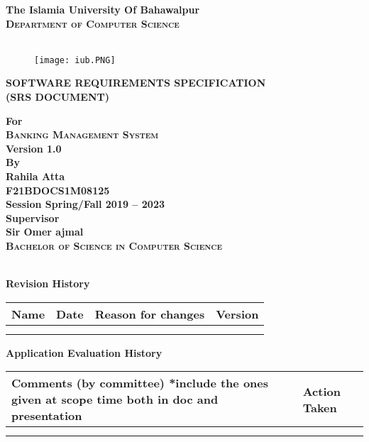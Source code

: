 \documentclass{article}
\begin{document}
\begin{titlepage}
    \centering
    {\bfseries\Large\gothfamily The Islamia University Of Bahawalpur}\\ \hfill \break
    {\Large\bfseries\scshape Department of Computer Science}\\\\
    \begin{figure}[htp]
    \centering
    \texttt{[image: iub.PNG]}
    \label{fig:iub}
\end{figure}
    {\bfseries\Large SOFTWARE REQUIREMENTS SPECIFICATION}\\\hfill \break
    \textbf{(SRS DOCUMENT)}\\\hfill \break
    
    {\bfseries\Large For}\\ \hfill \break
    {\Large\bfseries\scshape Banking Management System}\\ \hfill \break
    \textbf{Version 1.0}\\ \hfill \break
    {\bfseries\Large By}\\ \hfill \break
    {\bfseries\Large Rahila Atta}\\ \hfill \break
    {\bfseries\Large F21BDOCS1M08125}\\ \hfill \break
    {\bfseries Session Spring/Fall 2019 – 2023}\\ \hfill \break
    {\bfseries\Large Supervisor}\\ \hfill \break
    {\bfseries\Large Sir Omer ajmal}\\ \hfill \break
    {\Large\bfseries\scshape Bachelor of Science in Computer Science }\\
  
  \end{titlepage}
\newpage
\tableofcontents
\newpage
\\
\textbf{Revision History}\\ \hfill \break
\begin{tabularx}{0.8\textwidth} { 
  | >{\raggedright\arraybackslash}X 
  | >{\centering\arraybackslash}X 
  | >{\raggedleft\arraybackslash}X 
  | >{\raggedleft\arraybackslash}X |}
 \hline
 Name & Date & Reason for changes & Version \\
 \hline
   &   &   &   &  \\
\hline
  &   &   &   &  \\
\hline
\end{tabularx}
\newpage
\textbf{Application Evaluation History}\\ \hfill \break
\begin{tabularx}{0.8\textwidth} { 
  | >{\raggedright\arraybackslash}X  
  | >{\raggedleft\arraybackslash}X |}
 \hline
 Comments (by committee)
*include the ones given at scope time both in doc and presentation
 & Action Taken  \\
 \hline
   &   &    \\
\hline
  &   &     \\
\hline
\end{tabularx}
\end{document}
